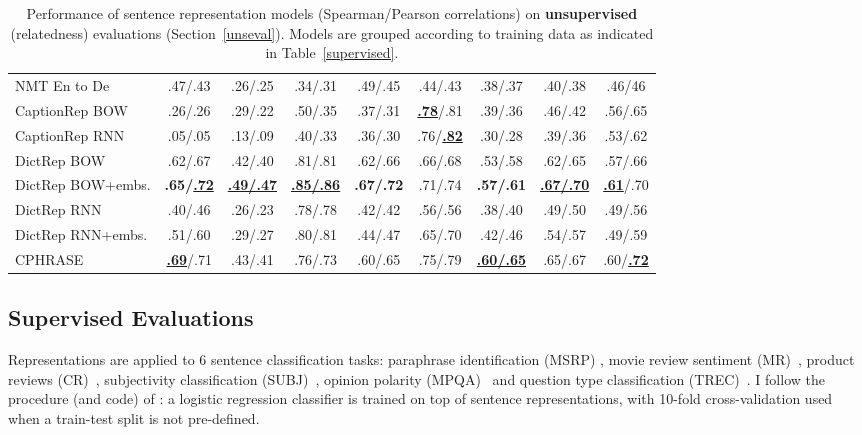 \begin{table*}[ht]
\begin{adjustwidth}{-1cm}{}
\begin{center}
{\begin{tabular}{l|cccccc|c|c}
          NMT En to De & .47/.43 & .26/.25 & .34/.31 & .49/.45 & .44/.43 & .38/.37 & .40/.38  &.46/46 \\
          CaptionRep BOW & .26/.26 & .29/.22	& .50/.35	& .37/.31 &  \underline{ \bf .78}/.81 & .39/.36 & .46/.42 & .56/.65 \\
          CaptionRep RNN & .05/.05	& .13/.09	& .40/.33	& .36/.30	& .76/\underline{\bf .82}	& .30/.28 & .39/.36 & .53/.62\\
                    DictRep BOW & .62/.67 	&.42/.40	&.81/.81	&.62/.66	&.66/.68	&.53/.58	&.62/.65 & .57/.66\\
          DictRep BOW+embs. & \bf .65/\underline{.72}	& \bf \underline{.49/.47}	& \bf  \underline{.85/.86}	& \bf  .67/.72	&.71/.74	& \bf .57/.61	&  \bf \underline{.67/.70}  & \underline{ {\bf .61}}/.70 \\
DictRep RNN & .40/.46	&.26/.23	&.78/.78	&.42/.42	&.56/.56	&.38/.40	&.49/.50 & .49/.56 \\
DictRep RNN+embs. & .51/.60	&.29/.27	&.80/.81	&.44/.47	&.65/.70	&.42/.46	&.54/.57 & .49/.59 \\
          \hline   
          CPHRASE & \underline{\bf .69}/.71 & .43/.41 & .76/.73  & .60/.65 & .75/.79 &  \bf \underline{.60/.65} &  .65/.67 & .60/\underline{\bf .72} \\
           
          \hline 
        \end{tabular}

    }
      \end{center}
      \end{adjustwidth}
    \caption{\label{unsupervised} Performance of sentence representation models (Spearman/Pearson correlations) on {\bf unsupervised} (relatedness) evaluations (Section~\ref{unseval}). Models are grouped according to training data as indicated in Table~\ref{supervised}.}
  \vspace*{-4ex} 
\end{table*}





\subsection{Supervised Evaluations}
\label{supersec}
Representations are applied to 6 sentence classification tasks: paraphrase identification (MSRP) \citep{dolan2004unsupervised}, movie review sentiment (MR)~\citep{pang2005seeing}, product reviews (CR)~\citep{hu2004mining}, subjectivity classification (SUBJ)~\citep{pang2004sentimental}, opinion polarity (MPQA)~\citep{wiebe2005annotating} and question type classification (TREC)~\citep{voorhees2002overview}. I follow the procedure (and code) of \cite{kiros2015skip}: a logistic regression classifier is trained on top of sentence representations, with 10-fold cross-validation used when a train-test split is not pre-defined. 

